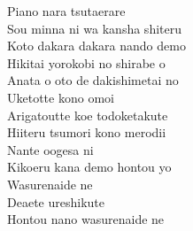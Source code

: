 \begin{multicols}{2}
Piano nara tsutaerare\\
Sou minna ni wa kansha shiteru\\
Koto dakara dakara nando demo\\
Hikitai yorokobi no shirabe o\\

Anata o oto de dakishimetai no\\
Uketotte kono omoi\\
Arigatoutte koe todoketakute\\
Hiiteru tsumori kono merodii\\
Nante oogesa ni\\
Kikoeru kana demo hontou yo\\
Wasurenaide ne\\
Deaete ureshikute\\
Hontou nano wasurenaide ne\\
\end{multicols}

\ifdefined\COMPLETE
\else
	
\fi
